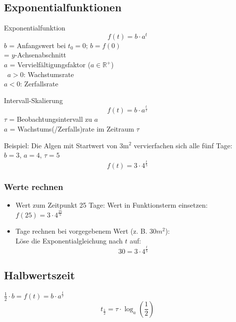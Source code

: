 



\newpage

\begin{multicols}{2}

\section{Exponentialfunktionen}
\begin{gesetz}{Exponentialfunktion}{}
$$f(t) = b\cdot{}a^t$$
$b$ = Anfangswert bei $t_0=0$; $b=f(0)$\\
\phantom{$b$} = $y$-Achsenabschnitt\\
$a$ = Vervielfältigungsfaktor ($a\in\mathbb{R}^{+}$)\\\
$a>0$: Wachstumsrate\\
$a<0$: Zerfallsrate
\end{gesetz}


\begin{rezept}{Intervall-Skalierung}{}
$$f(t) = b\cdot{}a^{\frac{t}{\tau}}$$
$\tau$ = Beobachtungsintervall zu $a$\\
$a$ = Wachstums(/Zerfalls)rate im Zeitraum $\tau$
\end{rezept}

Beispiel: Die Algen mit Startwert von $3\textrm{m}^2$ vervierfachen
sich alle fünf Tage:\\
$b=3$, $a=4$, $\tau=5$
$$f(t)= 3\cdot{}4^\frac{t}{5}$$

\subsubsection{Werte rechnen}
\begin{itemize}
\item
Wert zum Zeitpunkt 25 Tage: Wert in Funktionsterm einsetzen:\\
$f(25) = 3\cdot{}4^\frac{25}{5}$

\item
Tage rechnen bei vorgegebenem Wert (z. B. $30m^2$):\\
Löse die Exponentialgleichung nach $t$ auf:\\
$$30 = 3\cdot{}4^{\frac{t}{5}}$$
\end{itemize}

\subsection{Halbwertszeit}
$\frac12 \cdot{} b = f(t) = b\cdot{}a^{\frac{t}{\tau}}$
$$t_{\frac12} = \tau\cdot{}\log_a\left(\frac12\right)$$


\end{multicols}
